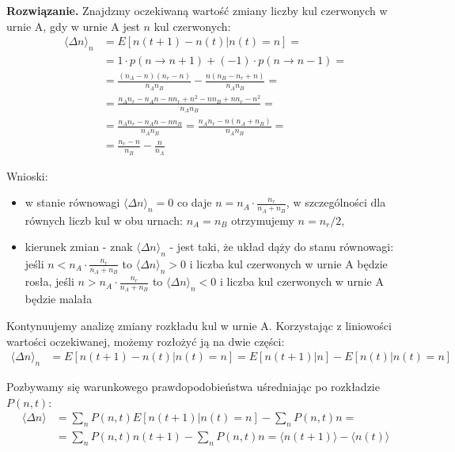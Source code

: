 \documentclass[11pt,a4paper]{article}
\newenvironment{solution}{\vspace{1cm} \par\textbf{Rozwiązanie.} \vspace{1cm}}{}
\begin{document}
\begin{solution}
Znajdzmy oczekiwaną wartość zmiany liczby kul czerwonych w urnie A,
gdy w urnie A jest $n$ kul czerwonych:
\begin{align*}
  \langle \Delta n \rangle_n &=  E[n(t+1) - n(t) | n(t) = n] = \\
  &= 1\cdot p(n \to n+1) + (-1) \cdot p(n \to n-1) = \\
  &= \frac{(n_A - n)(n_r - n)}{n_A n_B} - \frac{n(n_B - n_r + n)}{n_A n_B} = \\
  &= \frac{n_An_r - n_An - nn_r + n^2 - nn_B + nn_r - n^2}{n_A n_B} = \\
  &= \frac{n_An_r - n_An - nn_B}{n_A n_B} = 
  \frac{n_A n_r - n(n_A + n_B)}{n_A n_B} = \\
  &= \frac{n_r - n}{n_B}  - \frac{n}{n_A}
\end{align*}

Wnioski:
\begin{itemize}
  \item w stanie równowagi $\langle \Delta n \rangle_n = 0$ co daje $n = n_A \cdot \frac{n_r}{n_A + n_B}$,
        w szczególności dla równych liczb kul w obu urnach: $n_A = n_B$ otrzymujemy 
        $n = n_r/2$,
  \item kierunek zmian - znak $\langle \Delta n \rangle_n$ - jest taki, że układ dąży do stanu równowagi: 
        jeśli $n < n_A \cdot \frac{n_r}{n_A + n_B}$ to $\langle \Delta n \rangle_n > 0$ i liczba kul czerwonych w urnie A będzie rosła, 
        jeśli $n > n_A \cdot \frac{n_r}{n_A + n_B}$ to $\langle \Delta n \rangle_n < 0$ i liczba kul czerwonych w urnie A będzie malała
\end{itemize}

\vspace{0.5cm}

Kontynuujemy analizę zmiany rozkładu kul w urnie A.
Korzystając z liniowości wartości oczekiwanej, możemy rozłożyć ją na dwie części:
\begin{align*}
  \langle \Delta n \rangle_n &=  E[n(t+1) - n(t) | n(t) = n] = 
  E[n(t+1) | n] - E[n(t) | n(t) = n]
\end{align*}

Pozbywamy się warunkowego prawdopodobieństwa uśredniając po rozkładzie $P(n,t)$:
\begin{align*}
  \langle \Delta n \rangle  
  &= \sum_n P(n,t) E[n(t+1) | n(t) = n] - \sum_n P(n,t) n = \\
  &= \sum_n P(n,t) n(t+1) - \sum_n P(n,t) n = 
  \langle n(t+1) \rangle - \langle n(t) \rangle
\end{align*}


\end{solution}
\end{document}
